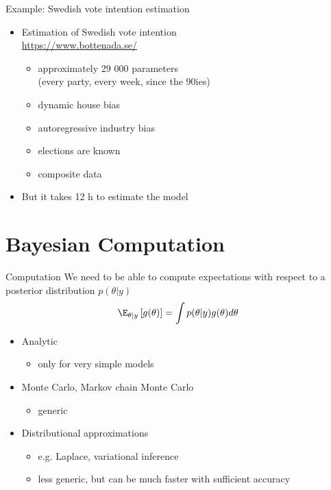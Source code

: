 \documentclass[10pt]{beamer}
\begin{document}
\begin{frame}{Example: Swedish vote intention estimation}

  \begin{itemize}
  \item Estimation of Swedish vote intention\\
  \url{https://www.bottenada.se/}
  \begin{itemize}
  \item approximately 29 000 parameters \\(every party, every week, since the 90ies)
  \item dynamic house bias
  \item autoregressive industry bias
  \item elections are known
  \item composite data
  \end{itemize}
  \pause
  \item But it takes 12 h to estimate the model
  \end{itemize}
\end{frame}


\section{Bayesian Computation}
\frame{\sectionpage}

\begin{frame}{Computation}
  We need to be able to compute expectations with respect to a posterior
  distribution $p(\theta|y)$
  \begin{align*}
    \E_{\theta|y}\left[ g(\theta) \right] = \int p(\theta|y)g(\theta) d\theta
  \end{align*}

  \begin{itemize}
  \item Analytic
    \begin{itemize}
    \item only for very simple models
    \end{itemize}
  \item Monte Carlo, Markov chain Monte Carlo
    \begin{itemize}
    \item generic
    \end{itemize}
  \item Distributional approximations
    \begin{itemize}
    \item e.g. Laplace, variational inference
    \item less generic, but can be much faster with sufficient accuracy
    \end{itemize}
  \end{itemize}
\end{frame}
\end{document}
